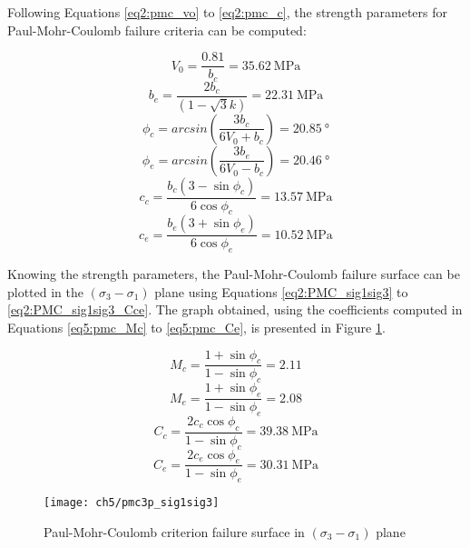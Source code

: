 Following Equations \ref{eq2:pmc_vo} to \ref{eq2:pmc_c}, the strength parameters for Paul-Mohr-Coulomb failure criteria can be computed:

\begin{equation}
    V_0 = \frac{0.81}{b_c} = \SI{35.62}{\mega\pascal}
\end{equation}
\begin{equation}\label{eq5:pmc_be}
    b_e = \frac{2b_c}{(1-\sqrt{3}k)} = \SI{22.31}{\mega\pascal}
\end{equation}
\begin{equation}
    \phi_c = arcsin\left(\frac{3b_c}{6V_0+b_c}\right) = \SI{20.85}{\degree}
\end{equation}
\begin{equation}
    \phi_e = arcsin\left(\frac{3b_e}{6V_0-b_c}\right) = \SI{20.46}{\degree}
\end{equation}
\begin{equation}
    c_{c}=\frac{b_{c}\left(3-\sin \phi_{c}\right)}{6 \cos \phi_{c}} = \SI{13.57}{\mega\pascal}
\end{equation}
\begin{equation}
    c_{e}=\frac{b_{e}\left(3+\sin \phi_{e}\right)}{6 \cos \phi_{e}} = \SI{10.52}{\mega\pascal}
\end{equation}

Knowing the strength parameters, the Paul-Mohr-Coulomb failure surface can be plotted in the $(\sigma_3-\sigma_1)$ plane using Equations \ref{eq2:PMC_sig1sig3} to \ref{eq2:PMC_sig1sig3_Cce}. The graph obtained, using the coefficients computed in Equations \ref{eq5:pmc_Mc} to \ref{eq5:pmc_Ce}, is presented in Figure \ref{fig5:pmc_sig1sig3}.

\begin{equation}\label{eq5:pmc_Mc}
    M_c = \frac{1+\sin \phi_c}{1-\sin \phi_c} = 2.11
\end{equation}
\begin{equation}
    M_e = \frac{1+\sin \phi_e}{1-\sin \phi_e} = 2.08
\end{equation}
\begin{equation}
    C_c = \frac{2c_c\cos \phi_c}{1-\sin \phi_c} = \SI{39.38}{\mega\pascal}
\end{equation}
\begin{equation}\label{eq5:pmc_Ce}
    C_e = \frac{2c_e\cos \phi_e}{1-\sin \phi_e} = \SI{30.31}{\mega\pascal}
\end{equation}

\begin{figure}[p]
    \centering
    \texttt{[image: ch5/pmc3p\_sig1sig3]}
    \caption{Paul-Mohr-Coulomb criterion failure surface in  $(\sigma_3-\sigma_1)$ plane}
    \label{fig5:pmc_sig1sig3}
\end{figure}

